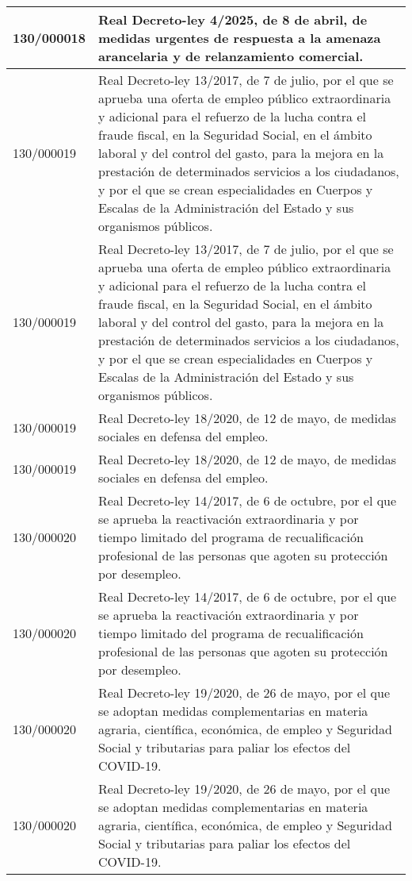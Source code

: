 {\begin{table}[H]
\begin{center}
\begin{tabularx}{\linewidth}{| l | X |}
\hline
130/000018 & Real Decreto-ley 4/2025, de 8 de abril, de medidas urgentes de respuesta a la amenaza arancelaria y de relanzamiento comercial. \\
\hline
130/000019 & Real Decreto-ley 13/2017, de 7 de julio, por el que se aprueba una oferta de empleo público extraordinaria y adicional para el refuerzo de la lucha contra el fraude fiscal, en la Seguridad Social, en el ámbito laboral y del control del gasto, para la mejora en la prestación de determinados servicios a los ciudadanos, y por el que se crean especialidades en Cuerpos y Escalas de la Administración del Estado y sus organismos públicos. \\
\hline
130/000019 & Real Decreto-ley 13/2017, de 7 de julio, por el que se aprueba una oferta de empleo público extraordinaria y adicional para el refuerzo de la lucha contra el fraude fiscal, en la Seguridad Social, en el ámbito laboral y del control del gasto, para la mejora en la prestación de determinados servicios a los ciudadanos, y por el que se crean especialidades en Cuerpos y Escalas de la Administración del Estado y sus organismos públicos. \\
\hline
130/000019 & Real Decreto-ley 18/2020, de 12 de mayo, de medidas sociales en defensa del empleo. \\
\hline
130/000019 & Real Decreto-ley 18/2020, de 12 de mayo, de medidas sociales en defensa del empleo. \\
\hline
130/000020 & Real Decreto-ley 14/2017, de 6 de octubre, por el que se aprueba la reactivación extraordinaria y por tiempo limitado del programa de recualificación profesional de las personas que agoten su protección por desempleo. \\
\hline
130/000020 & Real Decreto-ley 14/2017, de 6 de octubre, por el que se aprueba la reactivación extraordinaria y por tiempo limitado del programa de recualificación profesional de las personas que agoten su protección por desempleo. \\
\hline
130/000020 & Real Decreto-ley 19/2020, de 26 de mayo, por el que se adoptan medidas complementarias en materia agraria, científica, económica, de empleo y Seguridad Social y tributarias para paliar los efectos del COVID-19. \\
\hline
130/000020 & Real Decreto-ley 19/2020, de 26 de mayo, por el que se adoptan medidas complementarias en materia agraria, científica, económica, de empleo y Seguridad Social y tributarias para paliar los efectos del COVID-19. \\
\hline

\end{tabularx}
\end{center}
\end{table}}
